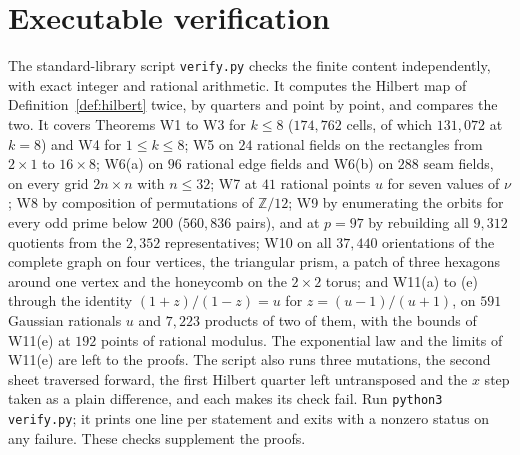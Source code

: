 \documentclass[11pt,a4paper]{article}
\theoremstyle{definition}
\newcommand{\Z}{\mathbb Z}
\begin{document}
\section{Executable verification}
The standard-library script \texttt{verify.py} checks the finite content independently, with exact integer and rational arithmetic. It computes the Hilbert map of Definition~\ref{def:hilbert} twice, by quarters and point by point, and compares the two. It covers Theorems W1 to W3 for $k\le8$ ($174{,}762$ cells, of which $131{,}072$ at $k=8$) and W4 for $1\le k\le8$; W5 on $24$ rational fields on the rectangles from $2\times1$ to $16\times8$; W6(a) on $96$ rational edge fields and W6(b) on $288$ seam fields, on every grid $2n\times n$ with $n\le32$; W7 at $41$ rational points $u$ for seven values of $\nu$; W8 by composition of permutations of $\Z/12$; W9 by enumerating the orbits for every odd prime below $200$ ($560{,}836$ pairs), and at $p=97$ by rebuilding all $9{,}312$ quotients from the $2{,}352$ representatives; W10 on all $37{,}440$ orientations of the complete graph on four vertices, the triangular prism, a patch of three hexagons around one vertex and the honeycomb on the $2\times2$ torus; and W11(a) to (e) through the identity $(1+z)/(1-z)=u$ for $z=(u-1)/(u+1)$, on $591$ Gaussian rationals $u$ and $7{,}223$ products of two of them, with the bounds of W11(e) at $192$ points of rational modulus. The exponential law and the limits of W11(e) are left to the proofs. The script also runs three mutations, the second sheet traversed forward, the first Hilbert quarter left untransposed and the $x$ step taken as a plain difference, and each makes its check fail. Run \texttt{python3 verify.py}; it prints one line per statement and exits with a nonzero status on any failure. These checks supplement the proofs.
\end{document}
